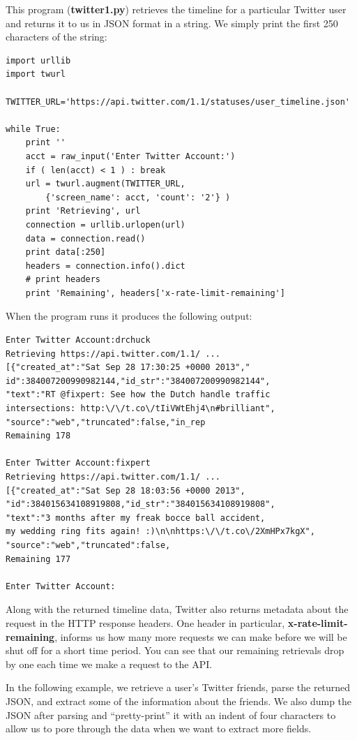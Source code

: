 This program ({\bf twitter1.py}) retrieves the timeline
for a particular Twitter user and returns it to us in JSON
format in a string.  We simply print the first 250 characters
of the string:

\beforeverb
\begin{verbatim}
import urllib
import twurl

TWITTER_URL='https://api.twitter.com/1.1/statuses/user_timeline.json'

while True:
    print ''
    acct = raw_input('Enter Twitter Account:')
    if ( len(acct) < 1 ) : break
    url = twurl.augment(TWITTER_URL,
        {'screen_name': acct, 'count': '2'} )
    print 'Retrieving', url
    connection = urllib.urlopen(url)
    data = connection.read()
    print data[:250]
    headers = connection.info().dict
    # print headers
    print 'Remaining', headers['x-rate-limit-remaining']
\end{verbatim}
\afterverb
%
When the program runs it produces the following output: 
 
\beforeverb
\begin{verbatim}
Enter Twitter Account:drchuck
Retrieving https://api.twitter.com/1.1/ ...
[{"created_at":"Sat Sep 28 17:30:25 +0000 2013","
id":384007200990982144,"id_str":"384007200990982144",
"text":"RT @fixpert: See how the Dutch handle traffic 
intersections: http:\/\/t.co\/tIiVWtEhj4\n#brilliant",
"source":"web","truncated":false,"in_rep
Remaining 178

Enter Twitter Account:fixpert
Retrieving https://api.twitter.com/1.1/ ...
[{"created_at":"Sat Sep 28 18:03:56 +0000 2013",
"id":384015634108919808,"id_str":"384015634108919808",
"text":"3 months after my freak bocce ball accident, 
my wedding ring fits again! :)\n\nhttps:\/\/t.co\/2XmHPx7kgX",
"source":"web","truncated":false,
Remaining 177

Enter Twitter Account:
\end{verbatim}
\afterverb
%
Along with the returned timeline data, Twitter also returns
metadata about the request in the HTTP response headers. 
One header in particular, {\bf x-rate-limit-remaining}, informs
us how many more requests we can make before we will be shut 
off for a short time period.  You can see that our remaining 
retrievals drop by one each time we make a request to the 
API.

In the following example, we retrieve a user's Twitter friends,
parse the returned JSON, and extract some of the information
about the friends.  We also dump the JSON after parsing and
``pretty-print'' it with an indent of four characters to allow
us to pore through the data when we want to extract more fields.


